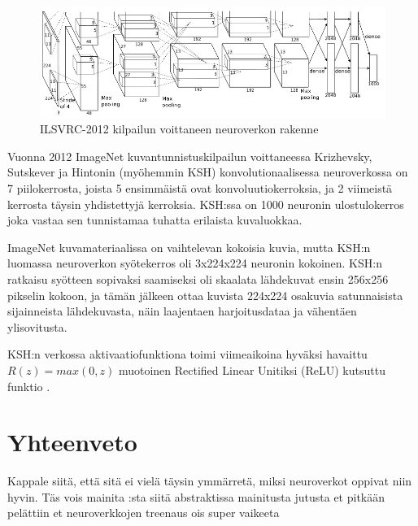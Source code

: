 \documentclass[finnish]{tktltiki2}
\theoremstyle{definition}
\theoremstyle{remark}
\begin{document}
    \begin{figure}[h]
    \centering
    \includegraphics[scale=0.4]{imagenet}
    \caption{ILSVRC-2012 kilpailun voittaneen neuroverkon rakenne \cite{KSHimagenet2012}}
    \label{pic:hsk-neuralnet}
    \end{figure}

    Vuonna 2012 ImageNet kuvantunnistuskilpailun voittaneessa Krizhevsky, Sutskever ja Hintonin (myöhemmin KSH) konvolutionaalisessa neuroverkossa on 7 piilokerrosta, joista 5 ensimmäistä ovat konvoluutiokerroksia, ja 2 viimeistä kerrosta täysin yhdistettyjä kerroksia. KSH:ssa on 1000 neuronin ulostulokerros joka vastaa sen tunnistamaa tuhatta erilaista kuvaluokkaa.
    
    ImageNet kuvamateriaalissa on vaihtelevan kokoisia kuvia, mutta KSH:n luomassa neuroverkon syötekerros oli 3x224x224 neuronin kokoinen. KSH:n ratkaisu syötteen sopivaksi saamiseksi oli skaalata lähdekuvat ensin 256x256 pikselin kokoon, ja tämän jälkeen ottaa kuvista 224x224 osakuvia satunnaisista sijainneista lähdekuvasta, näin laajentaen harjoitusdataa ja vähentäen ylisovitusta.
    
    KSH:n verkossa aktivaatiofunktiona toimi viimeaikoina hyväksi havaittu $R(z) = max(0, z)$ muotoinen Rectified Linear Unitiksi (ReLU) kutsuttu funktio \cite{KSHimagenet2012}.



\section{Yhteenveto} 

Kappale siitä, että sitä ei vielä täysin ymmärretä, miksi neuroverkot oppivat niin hyvin. Täs vois mainita \cite{neural-optimization-goodfellow-2015} :sta siitä abstraktissa mainitusta jutusta et pitkään pelättiin et neuroverkkojen treenaus ois super vaikeeta
\end{document}
